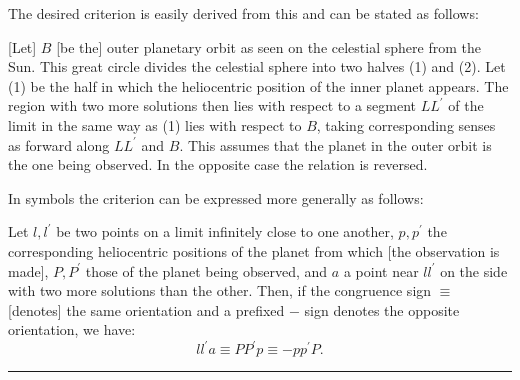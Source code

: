 The desired criterion is easily derived from this and can be stated as follows:

[Let] \(B\) [be the] outer planetary orbit as seen on the celestial sphere from the Sun. This great circle divides the celestial sphere into two halves (1) and (2). Let (1) be the half in which the heliocentric position of the inner planet appears. The region with two more solutions then lies with respect to a segment \(LL^{\prime}\) of the limit in the same way as (1) lies with respect to \(B\), taking corresponding senses as forward along \(LL^{\prime}\) and \(B\). This assumes that the planet in the outer orbit is the one being observed. In the opposite case the relation is reversed.

In symbols the criterion can be expressed more generally as follows:

Let \(l,l^{\prime}\) be two points on a limit infinitely close to one another, \(p,p^{\prime}\) the corresponding heliocentric positions of the planet from which [the observation is made], \(P,P^{\prime}\) those of the planet being observed, and \(a\) a point near \(ll^{\prime}\) on the side with two more solutions than the other. Then, if the congruence sign \(\equiv\) [denotes] the same orientation and a prefixed \(-\) sign denotes the opposite orientation, we have:
\[
ll^{\prime}a\equiv PP^{\prime}p\equiv-pp^{\prime}P.
\]
\begin{center}\rule{.22\textwidth}{.3pt}\end{center}
